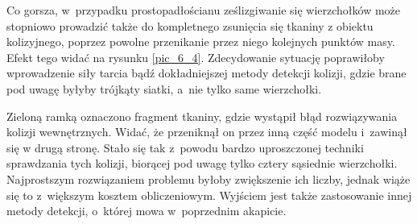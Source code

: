 		
		Co gorsza, w~przypadku prostopadłościanu ześlizgiwanie się wierzchołków może stopniowo prowadzić także do kompletnego zsunięcia się tkaniny z obiektu kolizyjnego, poprzez powolne przenikanie przez niego kolejnych punktów masy. Efekt tego widać na rysunku \ref{pic_6_4}. Zdecydowanie sytuację poprawiłoby wprowadzenie siły tarcia bądź dokładniejszej metody detekcji kolizji, gdzie brane pod uwagę byłyby trójkąty siatki, a~nie tylko same wierzchołki.
		
		Zieloną ramką oznaczono fragment tkaniny, gdzie wystąpił błąd rozwiązywania kolizji wewnętrznych. Widać, że przeniknął on przez inną część modelu i~zawinął się w drugą stronę. Stało się tak z~powodu bardzo uproszczonej techniki sprawdzania tych kolizji, biorącej pod uwagę tylko cztery sąsiednie wierzchołki. Najprostszym rozwiązaniem problemu byłoby zwiększenie ich liczby, jednak wiąże się to z~większym kosztem obliczeniowym. Wyjściem jest także zastosowanie innej metody detekcji, o~której mowa w~poprzednim akapicie.
			
			
			

